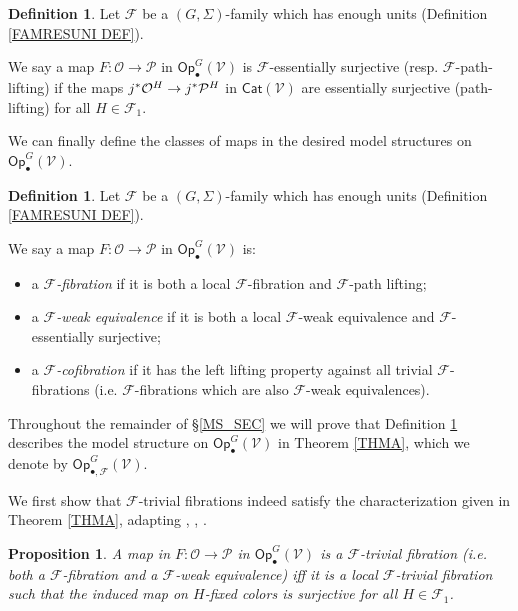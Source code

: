 \documentclass[a4paper,10pt
,draft
]{article}%
\numberwithin{equation}{section}
\numberwithin{figure}{section}
\newtheorem{proposition}[equation]{Proposition}%
\theoremstyle{definition} %
\newtheorem{definition}[equation]{Definition}%
\newcommand{\F}{\ensuremath{\mathcal F}}
\newcommand{\V}{\ensuremath{\mathcal V}}
\renewcommand{\O}{\ensuremath{\mathcal O}}
\renewcommand{\P}{\ensuremath{\mathcal P}}
\newcommand{\1}{\ensuremath{\mathbbm 1}}%
\begin{document}
\begin{definition}\label{FESSENSURJ DEF}
Let $\F$ be a $(G, \Sigma)$-family which has enough units
(Definition \ref{FAMRESUNI DEF}).

We say a map $F: \O \to \P$ in $\mathsf{Op}^G_\bullet(\V)$
is $\F$-essentially surjective (resp. $\F$-path-lifting)
if the maps
$j^{\**}\O^H \to j^{\**} \P^H$
in $\mathsf{Cat}(\V)$ are essentially surjective (path-lifting) for all $H \in \F_1$.
\end{definition}



We can finally define the classes of maps in the desired model structures on $\mathsf{Op}^G_\bullet(\V)$.



\begin{definition}\label{MODEL_DEFN}
Let $\F$ be a $(G, \Sigma)$-family which has enough units
(Definition \ref{FAMRESUNI DEF}).

We say a map $F: \O \to \P$ in $\mathsf{Op}^G_\bullet(\V)$ is:
\begin{itemize}
	\item a {\em $\F$-fibration} if it is both a local $\F$-fibration and $\F$-path lifting;
	\item a {\em $\F$-weak equivalence} if it is both a local $\F$-weak equivalence and $\F$-essentially surjective;
	\item a \textit{$\F$-cofibration} if it has the left lifting property against all trivial $\F$-fibrations (i.e. $\F$-fibrations which are also $\F$-weak equivalences).
\end{itemize}
\end{definition}


Throughout the remainder of \S \ref{MS_SEC}
we will prove that 
Definition \ref{MODEL_DEFN} describes the model structure on 
$\mathsf{Op}^G_\bullet(\V)$
in Theorem \ref{THMA},
which we denote by
$\mathsf{Op}^G_{\bullet, \F}(\V)$.



We first show that $\F$-trivial fibrations
indeed satisfy the characterization given in Theorem \ref{THMA},
adapting \cite[4.8]{Cav}, \cite[2.3]{BM13}, \cite[1.18]{CM13b}.

\begin{proposition}\label{FTRIVCHAR PROP}
A map in $F: \O \to \P$ in $\mathsf{Op}^G_\bullet(\V)$ is 
a $\F$-trivial fibration (i.e. both a $\F$-fibration and a $\F$-weak equivalence) 
iff it is a local $\F$-trivial fibration
such that the induced map on $H$-fixed colors is surjective
for all $H \in \F_1$.
\end{proposition}
\end{document}
